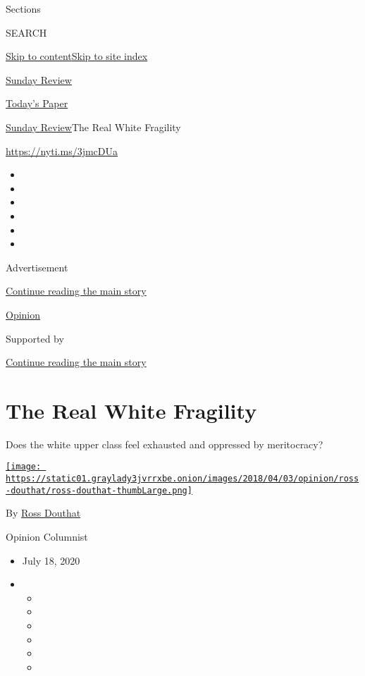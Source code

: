 Sections

SEARCH

\protect\hyperlink{site-content}{Skip to
content}\protect\hyperlink{site-index}{Skip to site index}

\href{https://www.nytimes3xbfgragh.onion/section/opinion/sunday}{Sunday
Review}

\href{https://myaccount.nytimes3xbfgragh.onion/auth/login?response_type=cookie\&client_id=vi}{}

\href{https://www.nytimes3xbfgragh.onion/section/todayspaper}{Today's
Paper}

\href{/section/opinion/sunday}{Sunday Review}\textbar{}The Real White
Fragility

\url{https://nyti.ms/3jmcDUa}

\begin{itemize}
\item
\item
\item
\item
\item
\item
\end{itemize}

Advertisement

\protect\hyperlink{after-top}{Continue reading the main story}

\href{/section/opinion}{Opinion}

Supported by

\protect\hyperlink{after-sponsor}{Continue reading the main story}

\hypertarget{the-real-white-fragility}{%
\section{The Real White Fragility}\label{the-real-white-fragility}}

Does the white upper class feel exhausted and oppressed by meritocracy?

\href{https://www.nytimes3xbfgragh.onion/by/ross-douthat}{\texttt{[image: https://static01.graylady3jvrrxbe.onion/images/2018/04/03/opinion/ross-douthat/ross-douthat-thumbLarge.png]}}

By \href{https://www.nytimes3xbfgragh.onion/by/ross-douthat}{Ross
Douthat}

Opinion Columnist

\begin{itemize}
\item
  July 18, 2020
\item
  \begin{itemize}
  \item
  \item
  \item
  \item
  \item
  \item
  \end{itemize}
\end{itemize}

